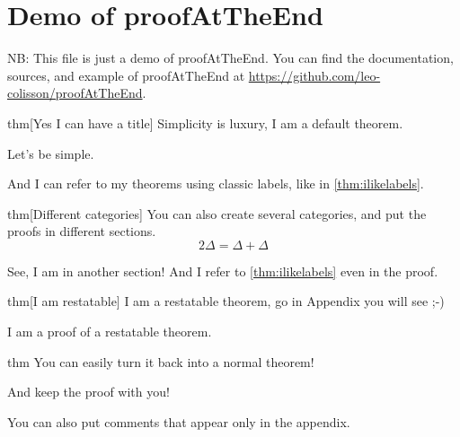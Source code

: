 \documentclass{article}
\begin{document}
\section{Demo of proofAtTheEnd}

NB: This file is just a demo of proofAtTheEnd.  You can find the documentation, sources, and example of proofAtTheEnd at \url{https://github.com/leo-colisson/proofAtTheEnd}.

\begin{theoremEnd}{thm}[Yes I can have a title]
  \label{thm:ilikelabels}
  Simplicity is luxury, I am a default theorem.
\end{theoremEnd}
\begin{proofEnd}
  Let's be simple.  
\end{proofEnd}

And I can refer to my theorems using classic labels, like in \autoref{thm:ilikelabels}.

\begin{theoremEnd}[category=greattheorem, end]{thm}[Different categories]
  You can also create several categories, and put the proofs in different sections.
  \[2\Delta = \Delta + \Delta\]
\end{theoremEnd}
\begin{proofEnd}
  See, I am in another section! And I refer to \autoref{thm:ilikelabels} even in the proof.
\end{proofEnd}

\begin{theoremEnd}[restate]{thm}[I am restatable]
  I am a restatable theorem, go in Appendix you will see ;-)
\end{theoremEnd}
\begin{proofEnd}
  I am a proof of a restatable theorem.  
\end{proofEnd}


\begin{theoremEnd}[normal]{thm}
  You can easily turn it back into a normal theorem!
\end{theoremEnd}
\begin{proofEnd}
  And keep the proof with you!  
\end{proofEnd}


You can also put comments that appear only in the appendix.

\end{document}
